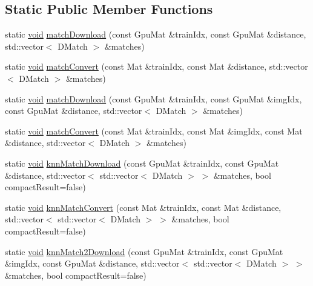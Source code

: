 \subsection*{Static Public Member Functions}
\begin{DoxyCompactItemize}
\item 
static \hyperlink{legacy_8hpp_a8bb47f092d473522721002c86c13b94e}{void} \hyperlink{classcv_1_1gpu_1_1BruteForceMatcher__GPU__base_aba00d772ae49c1f4269ae6d2745e5107}{match\-Download} (const Gpu\-Mat \&train\-Idx, const Gpu\-Mat \&distance, std\-::vector$<$ D\-Match $>$ \&matches)
\item 
static \hyperlink{legacy_8hpp_a8bb47f092d473522721002c86c13b94e}{void} \hyperlink{classcv_1_1gpu_1_1BruteForceMatcher__GPU__base_a291bc46d6d94f3a607804107fe701835}{match\-Convert} (const Mat \&train\-Idx, const Mat \&distance, std\-::vector$<$ D\-Match $>$ \&matches)
\item 
static \hyperlink{legacy_8hpp_a8bb47f092d473522721002c86c13b94e}{void} \hyperlink{classcv_1_1gpu_1_1BruteForceMatcher__GPU__base_a163396c466f0f4f35ded0ba070411408}{match\-Download} (const Gpu\-Mat \&train\-Idx, const Gpu\-Mat \&img\-Idx, const Gpu\-Mat \&distance, std\-::vector$<$ D\-Match $>$ \&matches)
\item 
static \hyperlink{legacy_8hpp_a8bb47f092d473522721002c86c13b94e}{void} \hyperlink{classcv_1_1gpu_1_1BruteForceMatcher__GPU__base_a33f4e5a6242153dd053654ae0b3219bf}{match\-Convert} (const Mat \&train\-Idx, const Mat \&img\-Idx, const Mat \&distance, std\-::vector$<$ D\-Match $>$ \&matches)
\item 
static \hyperlink{legacy_8hpp_a8bb47f092d473522721002c86c13b94e}{void} \hyperlink{classcv_1_1gpu_1_1BruteForceMatcher__GPU__base_a4fc7fe582f8c8c4664ab655ef4252826}{knn\-Match\-Download} (const Gpu\-Mat \&train\-Idx, const Gpu\-Mat \&distance, std\-::vector$<$ std\-::vector$<$ D\-Match $>$ $>$ \&matches, bool compact\-Result=false)
\item 
static \hyperlink{legacy_8hpp_a8bb47f092d473522721002c86c13b94e}{void} \hyperlink{classcv_1_1gpu_1_1BruteForceMatcher__GPU__base_ac3aab299c395e49daf2a147c440311cc}{knn\-Match\-Convert} (const Mat \&train\-Idx, const Mat \&distance, std\-::vector$<$ std\-::vector$<$ D\-Match $>$ $>$ \&matches, bool compact\-Result=false)
\item 
static \hyperlink{legacy_8hpp_a8bb47f092d473522721002c86c13b94e}{void} \hyperlink{classcv_1_1gpu_1_1BruteForceMatcher__GPU__base_a9479cddd36693e7f4108e28c03d8c3b7}{knn\-Match2\-Download} (const Gpu\-Mat \&train\-Idx, const Gpu\-Mat \&img\-Idx, const Gpu\-Mat \&distance, std\-::vector$<$ std\-::vector$<$ D\-Match $>$ $>$ \&matches, bool compact\-Result=false)

\end{DoxyCompactItemize}
